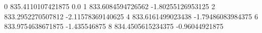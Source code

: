 0 835.4110107421875 0.0
1 833.6084594726562 -1.80255126953125
2 833.2952270507812 -2.11578369140625
4 833.6161499023438 -1.79486083984375
6 833.9754638671875 -1.435546875
8 834.4505615234375 -0.96044921875
